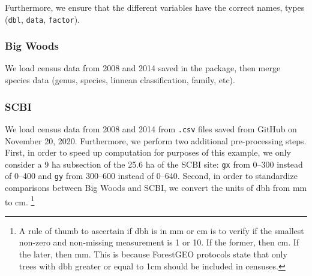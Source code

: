 \documentclass[12pt]{article}
\newenvironment{Shaded}{\begin{snugshade}}{\end{snugshade}}
\newcommand{\CommentTok}[1]{\textcolor[rgb]{0.56,0.35,0.01}{\textit{#1}}}
\newcommand{\DataTypeTok}[1]{\textcolor[rgb]{0.13,0.29,0.53}{#1}}
\newcommand{\DecValTok}[1]{\textcolor[rgb]{0.00,0.00,0.81}{#1}}
\newcommand{\KeywordTok}[1]{\textcolor[rgb]{0.13,0.29,0.53}{\textbf{#1}}}
\newcommand{\NormalTok}[1]{#1}
\newcommand{\OperatorTok}[1]{\textcolor[rgb]{0.81,0.36,0.00}{\textbf{#1}}}
\newcommand{\StringTok}[1]{\textcolor[rgb]{0.31,0.60,0.02}{#1}}
\begin{document}
Furthermore, we ensure that the different variables have the correct
names, types (\texttt{dbl}, \texttt{data}, \texttt{factor}).

\hypertarget{big-woods}{%
\subsubsection{Big Woods}\label{big-woods}}

We load census data from 2008 and 2014 saved in the package, then merge
species data (genus, species, linnean classification, family, etc).

\begin{Shaded}
\end{Shaded}

\hypertarget{scbi-data}{%
\subsubsection{SCBI}\label{scbi-data}}

We load census data from 2008 and 2014 from \texttt{.csv} files saved
from GitHub on November 20, 2020. Furthermore, we perform two additional
pre-processing steps. First, in order to speed up computation for
purposes of this example, we only consider a 9 ha subsection of the 25.6
ha of the SCBI site: \texttt{gx} from 0--300 instead of 0--400 and
\texttt{gy} from 300--600 instead of 0--640. Second, in order to
standardize comparisons between Big Woods and SCBI, we convert the units
of dbh from mm to cm. \footnote{A rule of thumb to ascertain if dbh is
  in mm or cm is to verify if the smallest non-zero and non-missing
  measurement is 1 or 10. If the former, then cm. If the later, then mm.
  This is because ForestGEO protocols state that only trees with dbh
  greater or equal to 1cm should be included in censuses. }
\end{document}
